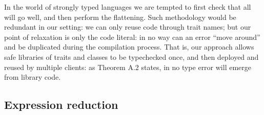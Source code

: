 %
%
%
%



\noindent 
In the world of strongly typed languages we are tempted to
first check that all will go well, and then perform the flattening. 
Such methodology would be redundant in our setting: we can only reuse code through trait names; but our point of relaxation is only the code literal: in no way can an error ``move around'' and be duplicated during the compilation process.
That is, our approach allows safe libraries of traits and classes to be typechecked once, and then deployed and reused by multiple clients: as Theorem A.2 states, in \name no type error will emerge from library code.



\subsection{Expression reduction}

